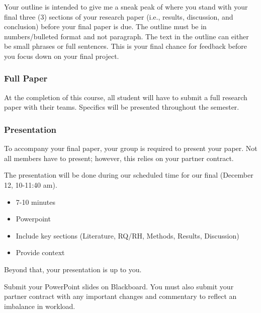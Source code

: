 \documentclass[
  b5paper]{book}
\begin{document}
Your outline is intended to give me a sneak peak of where you stand with your final three (3) sections of your research paper (i.e., results, discussion, and conclusion) before your final paper is due. The outline must be in numbers/bulleted format and not paragraph. The text in the outline can either be small phrases or full sentences. This is your final chance for feedback before you focus down on your final project.

\hypertarget{full-paper}{%
\subsubsection*{Full Paper}\label{full-paper}}

At the completion of this course, all student will have to submit a full research paper with their teams. Specifics will be presented throughout the semester.

\hypertarget{presentation}{%
\subsubsection*{Presentation}\label{presentation}}

To accompany your final paper, your group is required to present your paper. Not all members have to present; however, this relies on your partner contract.

The presentation will be done during our scheduled time for our final (December 12, 10-11:40 am).~

\begin{itemize}
\item
  7-10 minutes
\item
  Powerpoint
\item
  Include key sections (Literature, RQ/RH, Methods, Results, Discussion)
\item
  Provide context
\end{itemize}

Beyond that, your presentation is up to you.

Submit your PowerPoint slides on Blackboard. You must also submit your partner contract with any important changes and commentary to reflect an imbalance in workload.

  
\end{document}
